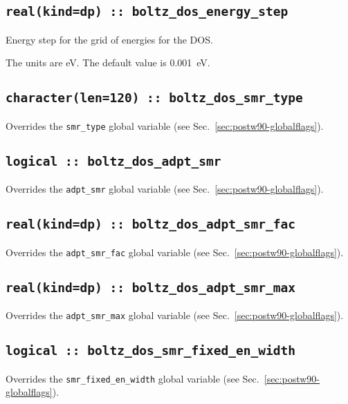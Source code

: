 \subsection[boltz\_dos\_energy\_step]{\tt real(kind=dp) :: boltz\_dos\_energy\_step}
Energy step for the grid of energies for the DOS.

The units are eV.
The default value is 0.001~eV.

\subsection[boltz\_dos\_smr\_type]{\tt character(len=120) :: boltz\_dos\_smr\_type}
Overrides the \verb#smr_type# global variable (see
Sec.~\ref{sec:postw90-globalflags}).

\subsection[boltz\_dos\_adpt\_smr]{\tt logical :: boltz\_dos\_adpt\_smr}
Overrides the \verb#adpt_smr# global variable (see
Sec.~\ref{sec:postw90-globalflags}).

\subsection[boltz\_dos\_adpt\_smr\_fac]{\tt real(kind=dp) :: boltz\_dos\_adpt\_smr\_fac}
Overrides the \verb#adpt_smr_fac# global variable (see
Sec.~\ref{sec:postw90-globalflags}).

\subsection[boltz\_dos\_adpt\_smr\_max]{\tt real(kind=dp) :: boltz\_dos\_adpt\_smr\_max}
Overrides the \verb#adpt_smr_max# global variable (see
Sec.~\ref{sec:postw90-globalflags}).

\subsection[boltz\_dos\_smr\_fixed\_en\_width]{\tt logical :: boltz\_dos\_smr\_fixed\_en\_width}
Overrides the \verb#smr_fixed_en_width# global variable (see
Sec.~\ref{sec:postw90-globalflags}).

%

